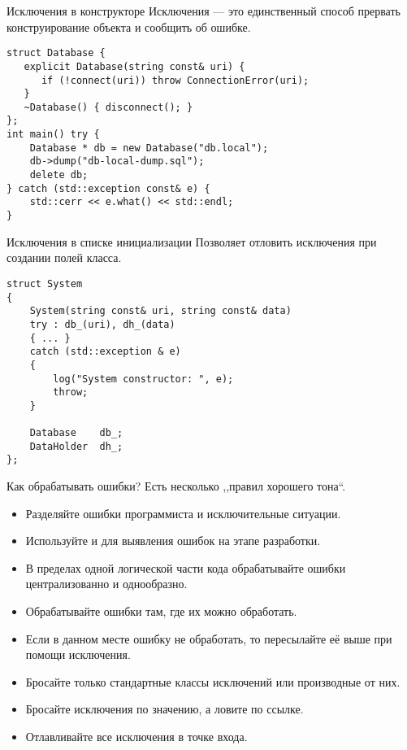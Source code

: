 \documentclass{beamer}
\begin{document}
\begin{frame}[fragile]{Исключения в конструкторе}
Исключения — это единственный способ
прервать  конструирование объекта и сообщить об ошибке.

\begin{lstlisting}
struct Database {
   explicit Database(string const& uri) {
      if (!connect(uri)) throw ConnectionError(uri);
   }
   ~Database() { disconnect(); }
};
int main() try {
    Database * db = new Database("db.local");
    db->dump("db-local-dump.sql");
    delete db;
} catch (std::exception const& e) {
    std::cerr << e.what() << std::endl;
}

\end{lstlisting}
\end{frame}

\begin{frame}[fragile]{Исключения в списке инициализации}
Позволяет отловить исключения при создании полей класса.
\begin{lstlisting}
struct System 
{
    System(string const& uri, string const& data)
    try : db_(uri), dh_(data)
    { ... }
    catch (std::exception & e) 
    {
        log("System constructor: ", e);
        throw;
    }
    
    Database    db_;
    DataHolder  dh_;
};   
\end{lstlisting}
\end{frame}


\begin{frame}[fragile]{Как обрабатывать ошибки?}
    Есть несколько ,,правил хорошего тона``.
    \begin{itemize}
        \item Разделяйте ошибки программиста и исключительные ситуации.
        \item Используйте  и  для выявления ошибок на этапе разработки.
        \item В пределах одной логической части кода обрабатывайте ошибки централизованно и однообразно.
        \item Обрабатывайте ошибки там, где их можно обработать.
        \item Если в данном месте ошибку не обработать, то пересылайте её выше при помощи исключения.
        \item Бросайте только стандартные классы исключений или производные от них.
        \item Бросайте исключения по значению, а ловите по ссылке.
        \item Отлавливайте все исключения в точке входа.

    \end{itemize}
\end{frame}
\end{document}
